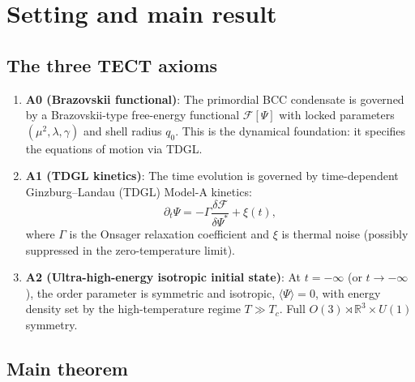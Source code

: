 \section{Setting and main result}
\subsection{The three TECT axioms}

\begin{enumerate}
\item {\bf A0 (Brazovskii functional)}: The primordial BCC condensate is
  governed by a Brazovskii-type free-energy functional $\mathcal{F}[\Psi]$
  with locked parameters $(\mu^2, \lambda, \gamma)$ and shell radius $q_0$.
  This is the dynamical foundation: it specifies the equations of motion
  via TDGL.

\item {\bf A1 (TDGL kinetics)}: The time evolution is governed by
  time-dependent Ginzburg–Landau (TDGL) Model-A kinetics:
  \begin{equation}
  \partial_t \Psi = -\Gamma \frac{\delta \mathcal{F}}{\delta \Psi^*} + \xi(t),
  \end{equation}
  where $\Gamma$ is the Onsager relaxation coefficient and $\xi$ is
  thermal noise (possibly suppressed in the zero-temperature limit).

\item {\bf A2 (Ultra-high-energy isotropic initial state)}: At $t = -\infty$
  (or $t \to -\infty$), the order parameter is symmetric and isotropic,
  $\langle \Psi \rangle = 0$, with energy density set by the high-temperature
  regime $T \gg T_c$. Full $O(3) \rtimes \mathbb{R}^3 \times U(1)$ symmetry.
\end{enumerate}

\subsection{Main theorem}

